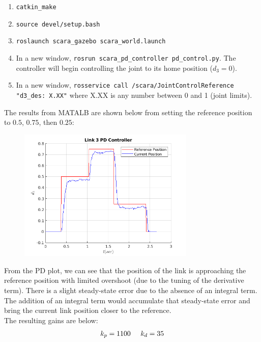 \documentclass[10pt]{article}
\begin{document}
\begin{enumerate}
	\begin{enumerate}
		\item \texttt{catkin\_make}
		\item \texttt{source devel/setup.bash}
		\item \texttt{roslaunch scara\_gazebo scara\_world.launch}
		\item In a new window, \texttt{rosrun scara\_pd\_controller pd\_control.py}. The controller will begin controlling the joint to its home position ($d_3 = 0$).
		\item In a new window, \texttt{rosservice call /scara/JointControlReference "d3\_des: X.XX"} where X.XX is any number between 0 and 1 (joint limits).
	\end{enumerate}


	The results from MATALB are shown below from setting the reference position to $0.5$, $0.75$, then $0.25$:

	\begin{figure}[H]
		\centering
		\includegraphics[width=0.75\textwidth]{figures/link_3_pd_plot1.png}
	\end{figure}
	
	From the PD plot, we can see that the position of the link is approaching the reference position with limited overshoot (due to the tuning of the derivative term). There is a slight steady-state error due to the absence of an integral term. The addition of an integral term would accumulate that steady-state error and bring the current link position closer to the reference. 
	\\
	
	The resulting gains are below:
	\begin{align*}
		k_p = 1100 \hspace{0.5cm} k_d = 35
	\end{align*}
	

\end{enumerate}
\end{document}
